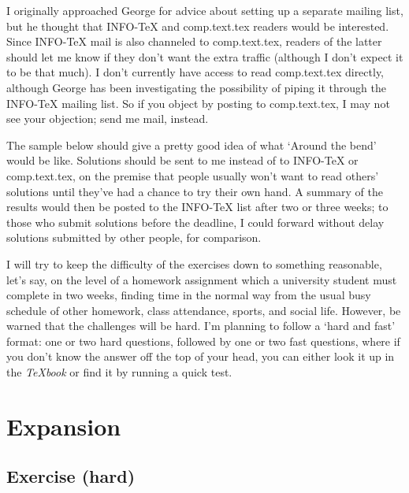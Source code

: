 I originally approached George for advice about setting up a separate
mailing list, but he thought that INFO-TeX and comp.text.tex readers
would be interested. Since INFO-TeX mail is also channeled to
comp.text.tex, readers of the latter should let me know if they don't
want the extra traffic (although I don't expect it to be that much). I
don't currently have access to read comp.text.tex directly, although
George has been investigating the possibility of piping it through the
INFO-TeX mailing list. So if you object by posting to comp.text.tex, I
may not see your objection; send me mail, instead.

The sample below should give a pretty good idea of what `Around the
bend' would be like. Solutions should be sent to me instead of to
INFO-TeX or comp.text.tex, on the premise that people usually won't want
to read others' solutions until they've had a chance to try their own
hand. A summary of the results would then be posted to the INFO-TeX
list after two or three weeks; to those who submit solutions before the
deadline, I could forward without delay solutions submitted by other
people, for comparison.

I will try to keep the difficulty of the exercises down to something
reasonable, let's say, on the level of a homework assignment which a
university student must complete in two weeks, finding time in the
normal way from the usual busy schedule of other homework, class
attendance, sports, and social life. However, be warned that the
challenges will be hard. I'm planning to follow a `hard and fast'
format: one or two hard questions, followed by one or two fast
questions, where if you don't know the answer off the top of your head,
you can either look it up in the \emph{TeXbook} or find it by running a quick
test.


\mainmatter


\chapter{Expansion}

\section{Exercise (hard)}


